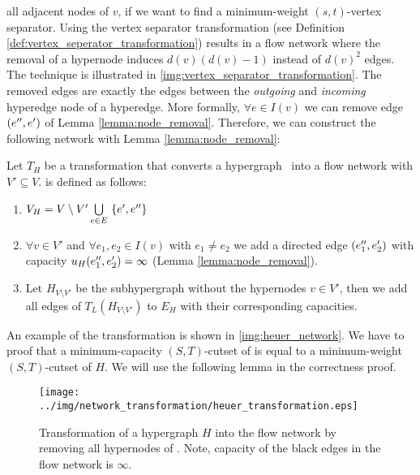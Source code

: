 all adjacent nodes of $v$, if we want to find a  minimum-weight $(s,t)$-vertex separator. 
Using the vertex separator transformation (see Definition \ref{def:vertex_seperator_transformation}) 
results in a flow network where the removal of a hypernode induces $d(v)(d(v)-1)$ instead of 
$d(v)^2$ edges. The technique is illustrated in \autoref{img:vertex_separator_transformation}.
The removed edges are exactly the edges between the \emph{outgoing} and \emph{incoming} hyperedge
node of a hyperedge. More formally, $\forall e \in I(v)$ we can remove edge 
$(e'',e')$ of Lemma \ref{lemma:node_removal}. Therefore, we can construct the
following network with Lemma \ref{lemma:node_removal}:

\begin{definition}
Let $T_H$ be a transformation that converts a hypergraph \HypergraphDef~into 
a flow network  with $V' \subseteq V$.  is defined as follows:
\begin{enumerate}
\item $V_H = V\setminus V' \bigcup\limits_{e \in E}\ \{e', e''\}$
\item $\forall v \in V'$ and $\forall e_1,e_2 \in I(v)$ with $e_1 \neq e_2$ we add a directed
      edge $(e_1'',e_2')$ with capacity $u_H(e_1'',e_2') = \infty$
      (Lemma \ref{lemma:node_removal}).
\item Let $H_{V \setminus V'}$ be the subhypergraph without the hypernodes $v \in V'$,
      then we add all edges of $T_L(H_{V \setminus V'})$ to $E_H$ with their corresponding capacities.
\end{enumerate} 
\end{definition}

An example of the transformation is shown in \autoref{img:heuer_network}.
We have to proof that a minimum-capacity $(S,T)$-cutset
of  is equal to a minimum-weight $(S,T)$-cutset of $H$. 
We will use the following lemma in the correctness proof.

\begin{figure}
\centering
\texttt{[image: ../img/network\_transformation/heuer\_transformation.eps]}
\caption{Transformation of a hypergraph $H$ into the flow network  by removing
         all hypernodes of . Note, capacity of the black edges in the flow network is $\infty$.}
\label{img:heuer_network}
\end{figure} 

